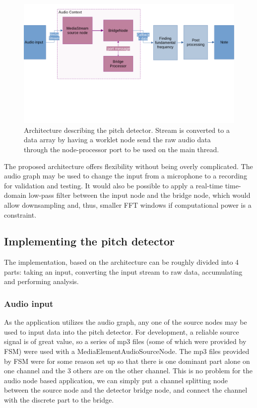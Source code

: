 \begin{figure}[ht]
    \centering
    \includegraphics[width=\textwidth]{./images/pdArchitecture.png}
    \caption{Architecture describing the pitch detector. Stream is converted to a data array by having a worklet node send the raw audio data through the node-processor port to be used on the main thread.\label{fig:pdArch}}
\end{figure}

The proposed architecture offers flexibility without being overly complicated. The audio graph may be used to change the input from a microphone to a recording for validation and testing. It would also be possible to apply a real-time time-domain low-pass filter between the input node and the bridge node, which would allow downsampling and, thus, smaller FFT windows if computational power is a constraint. 

\subsection{Implementing the pitch detector}
The implementation, based on the architecture can be roughly divided into 4 parts: taking an input, converting the input stream to raw data, accumulating and performing analysis.

\subsubsection{Audio input}
As the application utilizes the audio graph, any one of the source nodes may be used to input data into the pitch detector. For development, a reliable source signal is of great value, so a series of mp3 files (some of which were provided by FSM) were used with a MediaElementAudioSourceNode. The mp3 files provided by FSM were for some reason set up so that there is one dominant part  alone on one channel and the 3 others are on the other channel. This is no problem for the audio node based application, we can simply put a channel splitting node between the source node and the detector bridge node, and connect the channel with the discrete part to the bridge.


